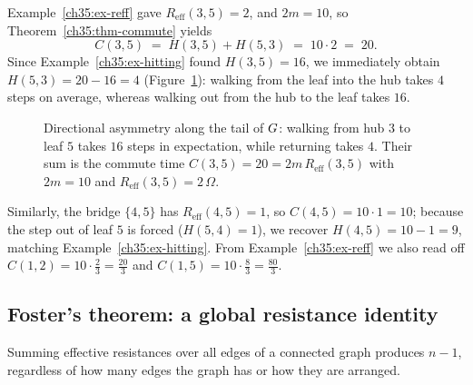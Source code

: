 \begin{example}\label{ch35:ex-commute}
Example~\ref{ch35:ex-reff} gave $R_{\mathrm{eff}}(3,5)=2$, and $2m=10$, so Theorem~\ref{ch35:thm-commute} yields
\[
  C(3,5) \;=\; H(3,5)+H(5,3) \;=\; 10\cdot 2 \;=\; 20.
\]
Since Example~\ref{ch35:ex-hitting} found $H(3,5)=16$, we immediately obtain $H(5,3)=20-16=4$ (Figure~\ref{ch35:fig-asymmetry}): walking from the leaf into the hub takes $4$ steps on average, whereas walking out from the hub to the leaf takes $16$.

\begin{figure}[htbp]
\centering
{}
\caption{Directional asymmetry along the tail of $G$: walking from hub $3$ to leaf $5$ takes $16$ steps in expectation, while returning takes $4$. Their sum is the commute time $C(3,5)=20=2m\,R_{\mathrm{eff}}(3,5)$ with $2m=10$ and $R_{\mathrm{eff}}(3,5)=2\,\Omega$.}
\label{ch35:fig-asymmetry}
\end{figure}

Similarly, the bridge $\{4,5\}$ has $R_{\mathrm{eff}}(4,5)=1$, so $C(4,5)=10\cdot 1=10$; because the step out of leaf $5$ is forced ($H(5,4)=1$), we recover $H(4,5)=10-1=9$, matching Example~\ref{ch35:ex-hitting}. From Example~\ref{ch35:ex-reff} we also read off $C(1,2)=10\cdot\tfrac23=\tfrac{20}{3}$ and $C(1,5)=10\cdot\tfrac83=\tfrac{80}{3}$.
\end{example}

\subsection{Foster's theorem: a global resistance identity}

Summing effective resistances over all edges of a connected graph produces $n-1$, regardless of how many edges the graph has or how they are arranged.

